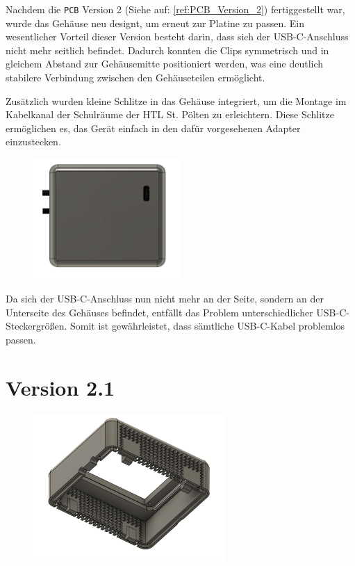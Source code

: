 \begin{inhalt}
Nachdem die \texttt{PCB} Version 2 (Siehe auf: \ref{ref:PCB_Version_2}) fertiggestellt war, wurde das Gehäuse neu designt, um erneut zur Platine zu passen.  
Ein wesentlicher Vorteil dieser Version besteht darin, dass sich der USB-C-Anschluss nicht mehr seitlich befindet.  
Dadurch konnten die Clips symmetrisch und in gleichem Abstand zur Gehäusemitte positioniert werden, was eine deutlich stabilere Verbindung zwischen den Gehäuseteilen ermöglicht.
 

\vspace{0.15cm}

Zusätzlich wurden kleine Schlitze in das Gehäuse integriert, um die Montage im Kabelkanal der Schulräume der HTL St. Pölten zu erleichtern.  
Diese Schlitze ermöglichen es, das Gerät einfach in den dafür vorgesehenen Adapter einzustecken.


\begin{figure}[!htb]
\centering
\includegraphics[width=0.5\textwidth]{files/Thomas/pics/geheause/2.0/gehaeuse_bot.png}
\caption[Bildbezeichnung für Abbildungsverzeichnis]{}
\label{fig:gehaeuse_internet_bild}
\end{figure}

Da sich der USB-C-Anschluss nun nicht mehr an der Seite, sondern an der Unterseite des Gehäuses befindet, entfällt das Problem unterschiedlicher USB-C-Steckergrößen.  
Somit ist gewährleistet, dass sämtliche USB-C-Kabel problemlos passen.


\section{Version 2.1}

\begin{figure}[!htb]
\centering
\includegraphics[width=0.65\textwidth]{files/Thomas/pics/geheause/2.1/gehaeuse_side.png}
\caption[Bildbezeichnung für Abbildungsverzeichnis]{}
\label{fig:gehaeuse_internet_bild}
\end{figure}




\end{inhalt}
